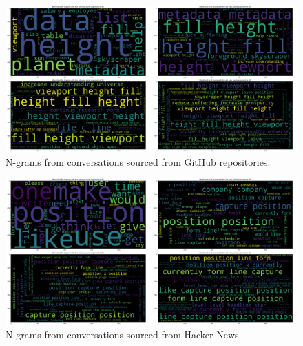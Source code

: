 \begin{figure}[H]
    \centering
    \includegraphics[width=\textwidth]{imgs/repository-ngrams.png}
    \caption{N-grams from conversations sourced from GitHub repositories.}
    \label{fig:repositories-ngrams}
\end{figure}

\begin{figure}[H]
    \centering
    \includegraphics[width=\textwidth]{imgs/hacker_news-ngrams.png}
    \caption{N-grams from conversations sourced from Hacker News.}
    \label{fig:hn-ngrams}
\end{figure}
